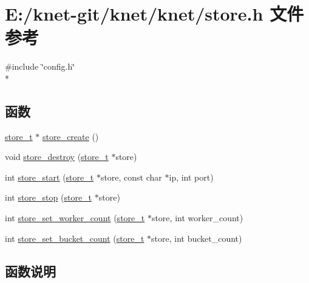 \hypertarget{a00072}{}\section{E\+:/knet-\/git/knet/knet/store.h 文件参考}
\label{a00072}
{\ttfamily \#include \char`\"{}config.\+h\char`\"{}}\\*
\subsection*{函数}
\begin{DoxyCompactItemize}
\item 
\hyperlink{a00044_ac5e23aa8669eede04d771010dbd201b4_ac5e23aa8669eede04d771010dbd201b4}{store\+\_\+t} $\ast$ \hyperlink{a00072_a1af7550aea3890ee5b11b7a63d9ab515_a1af7550aea3890ee5b11b7a63d9ab515}{store\+\_\+create} ()
\item 
void \hyperlink{a00072_a8e0eefdf8c2410878667f0c535909cf8_a8e0eefdf8c2410878667f0c535909cf8}{store\+\_\+destroy} (\hyperlink{a00044_ac5e23aa8669eede04d771010dbd201b4_ac5e23aa8669eede04d771010dbd201b4}{store\+\_\+t} $\ast$store)
\item 
int \hyperlink{a00072_a679dfe593c799419037e5d200386ecc7_a679dfe593c799419037e5d200386ecc7}{store\+\_\+start} (\hyperlink{a00044_ac5e23aa8669eede04d771010dbd201b4_ac5e23aa8669eede04d771010dbd201b4}{store\+\_\+t} $\ast$store, const char $\ast$ip, int port)
\item 
int \hyperlink{a00072_ac18172cdd31b0f5ec3f3be7750a1d49c_ac18172cdd31b0f5ec3f3be7750a1d49c}{store\+\_\+stop} (\hyperlink{a00044_ac5e23aa8669eede04d771010dbd201b4_ac5e23aa8669eede04d771010dbd201b4}{store\+\_\+t} $\ast$store)
\item 
int \hyperlink{a00072_a02e291e9e967e22a66b0907d776f139f_a02e291e9e967e22a66b0907d776f139f}{store\+\_\+set\+\_\+worker\+\_\+count} (\hyperlink{a00044_ac5e23aa8669eede04d771010dbd201b4_ac5e23aa8669eede04d771010dbd201b4}{store\+\_\+t} $\ast$store, int worker\+\_\+count)
\item 
int \hyperlink{a00072_a869ae551132a316c05015e9855e9ff68_a869ae551132a316c05015e9855e9ff68}{store\+\_\+set\+\_\+bucket\+\_\+count} (\hyperlink{a00044_ac5e23aa8669eede04d771010dbd201b4_ac5e23aa8669eede04d771010dbd201b4}{store\+\_\+t} $\ast$store, int bucket\+\_\+count)
\end{DoxyCompactItemize}


\subsection{函数说明}
\hypertarget{a00072_a1af7550aea3890ee5b11b7a63d9ab515_a1af7550aea3890ee5b11b7a63d9ab515}{}

